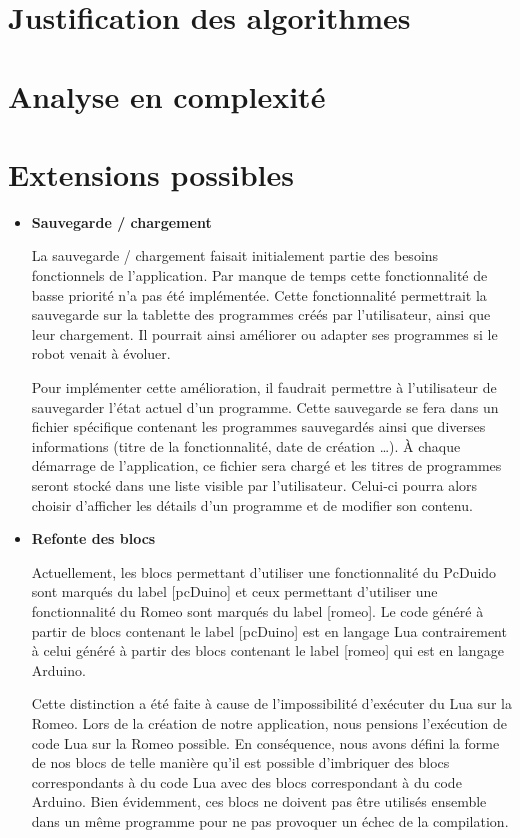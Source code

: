 \documentclass[12pt,francais]{report}
\begin{document}
\section*{Justification des algorithmes}

\section*{Analyse en complexité}

\section*{Extensions possibles}

\begin{itemize}

\item \textbf{Sauvegarde / chargement}

La sauvegarde / chargement faisait initialement partie des besoins fonctionnels de l'application. Par manque de temps cette fonctionnalité de basse priorité n'a pas été implémentée. Cette fonctionnalité permettrait la sauvegarde sur la tablette des programmes créés par l'utilisateur, ainsi que leur chargement. Il pourrait ainsi améliorer ou adapter ses programmes si le robot venait à évoluer.

Pour implémenter cette amélioration, il faudrait permettre à l'utilisateur de sauvegarder l'état actuel d'un programme. Cette sauvegarde se fera dans un fichier spécifique contenant les programmes sauvegardés ainsi que diverses informations (titre de la fonctionnalité, date de création …). À chaque démarrage de l'application, ce fichier sera chargé et les titres de programmes seront stocké dans une liste visible par l'utilisateur. Celui-ci pourra alors choisir d'afficher les détails d'un programme et de modifier son contenu.

\bigskip
\item \textbf{Refonte des blocs}

Actuellement, les blocs permettant d'utiliser une fonctionnalité du PcDuido sont marqués du label [pcDuino] et ceux permettant d'utiliser une fonctionnalité du Romeo sont marqués du label [romeo].
Le code généré à partir de blocs contenant le label [pcDuino] est en langage Lua contrairement à celui généré à partir des blocs contenant le label [romeo] qui est en langage Arduino.

Cette distinction a été faite à cause de l'impossibilité d'exécuter du Lua sur la Romeo. Lors de la création de notre application, nous pensions l'exécution de code Lua sur la Romeo possible. En conséquence, nous avons défini la forme de nos blocs de telle manière qu'il est possible d'imbriquer des blocs correspondants à du code Lua avec des blocs correspondant à du code Arduino. Bien évidemment, ces blocs ne doivent pas être utilisés ensemble dans un même programme pour ne pas provoquer un échec de la compilation.


\end{itemize}
\end{document}

